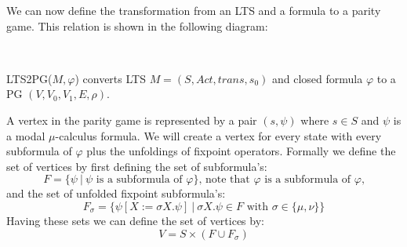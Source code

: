 We can now define the transformation from an LTS and a formula to a parity game. This relation is shown in the following diagram:

\\
\begin{definition}
	\label{def_LTS2PG}\cite{Bradfield2018}
	LTS2PG($M, \varphi$) converts LTS $M = (S, Act, trans, s_0)$ and closed formula $\varphi$ to a PG $(V, V_0, V_1, E, \rho)$.
	
	A vertex in the parity game is represented by a pair $(s, \psi)$ where $s \in S$ and $\psi$ is a modal $\mu$-calculus formula. We will create a vertex for every state with every subformula of $\varphi$ plus the unfoldings of fixpoint operators. Formally we define the set of vertices by first defining the set of subformula's:
	\[ F = \{ \psi\ |\ \psi \text{ is a subformula of } \varphi \} \text{, note that $\varphi$ is a subformula of $\varphi$,} \]
	and the set of unfolded fixpoint subformula's:
	\[ F_\sigma = \{\psi[X:=\sigma X. \psi]\ |\ \sigma X. \psi \in F \text{ with } \sigma \in \{\mu, \nu\}\} \]
	Having these sets we can define the set of vertices by:
	\[ V = S \times (F \cup F_{\sigma})\]
	

\end{definition}
